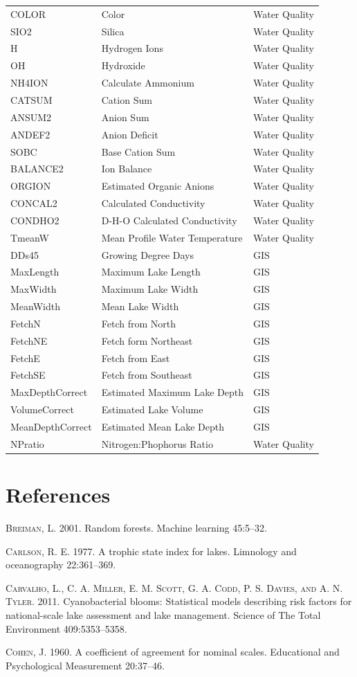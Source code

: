 \documentclass[11pt,]{article}
\begin{document}
\begin{longtable}[c]{@{}lll@{}}
COLOR & Color & Water Quality\tabularnewline
SIO2 & Silica & Water Quality\tabularnewline
H & Hydrogen Ions & Water Quality\tabularnewline
OH & Hydroxide & Water Quality\tabularnewline
NH4ION & Calculate Ammonium & Water Quality\tabularnewline
CATSUM & Cation Sum & Water Quality\tabularnewline
ANSUM2 & Anion Sum & Water Quality\tabularnewline
ANDEF2 & Anion Deficit & Water Quality\tabularnewline
SOBC & Base Cation Sum & Water Quality\tabularnewline
BALANCE2 & Ion Balance & Water Quality\tabularnewline
ORGION & Estimated Organic Anions & Water Quality\tabularnewline
CONCAL2 & Calculated Conductivity & Water Quality\tabularnewline
CONDHO2 & D-H-O Calculated Conductivity & Water Quality\tabularnewline
TmeanW & Mean Profile Water Temperature & Water Quality\tabularnewline
DDs45 & Growing Degree Days & GIS\tabularnewline
MaxLength & Maximum Lake Length & GIS\tabularnewline
MaxWidth & Maximum Lake Width & GIS\tabularnewline
MeanWidth & Mean Lake Width & GIS\tabularnewline
FetchN & Fetch from North & GIS\tabularnewline
FetchNE & Fetch form Northeast & GIS\tabularnewline
FetchE & Fetch from East & GIS\tabularnewline
FetchSE & Fetch from Southeast & GIS\tabularnewline
MaxDepthCorrect & Estimated Maximum Lake Depth & GIS\tabularnewline
VolumeCorrect & Estimated Lake Volume & GIS\tabularnewline
MeanDepthCorrect & Estimated Mean Lake Depth & GIS\tabularnewline
NPratio & Nitrogen:Phophorus Ratio & Water Quality\tabularnewline
\bottomrule
\end{longtable}

\newpage

\section*{References}\label{references}

\textsc{Breiman, L.} 2001. Random forests. Machine learning 45:5--32.

\textsc{Carlson, R. E.} 1977. A trophic state index for lakes. Limnology
and oceanography 22:361--369.

\textsc{Carvalho, L., C. A. Miller, E. M. Scott, G. A. Codd, P. S.
Davies, and A. N. Tyler}. 2011. Cyanobacterial blooms: Statistical
models describing risk factors for national-scale lake assessment and
lake management. Science of The Total Environment 409:5353--5358.

\textsc{Cohen, J.} 1960. A coefficient of agreement for nominal scales.
Educational and Psychological Measurement 20:37--46.
\end{document}
